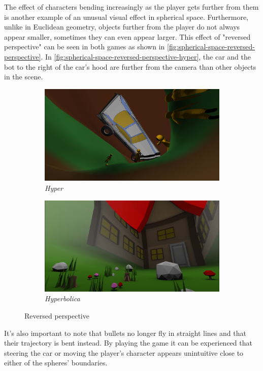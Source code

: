 The effect of characters bending increasingly as the player gets further from them is another example of an unusual visual effect in spherical space.
Furthermore, unlike in Euclidean geometry, objects further from the player do not always appear smaller, sometimes they can even appear larger.
This effect of "reversed perspective" can be seen in both games as shown in \autoref{fig:spherical-space-reversed-perspective}.
In \autoref{fig:spherical-space-reversed-perspective-hyper}, the car and the bot to the right of the car's hood are further from the camera than other objects in the scene.
\begin{figure}[h]
    \centering
    \begin{subfigure}[b]{0.475\textwidth}
        \centering
        \includegraphics[width=\textwidth]{chapters/results/sections/non_euclidean/resources/spherical-car.png}
        \caption[]%
        {{\small \textit{Hyper}}}
        \label{fig:spherical-space-reversed-perspective-hyper}
    \end{subfigure}
    \hfill
    \begin{subfigure}[b]{0.5\textwidth}
        \centering
        \includegraphics[width=\textwidth]{chapters/results/sections/non_euclidean/resources/hyperbolica-2.png}
        \caption[]%
        {{\small \textit{Hyperbolica}}}
        \label{fig:spherical-space-reversed-perspective-hyperbolica}
    \end{subfigure}
    \caption[]
    {\small Reversed perspective}
    \label{fig:spherical-space-reversed-perspective}
\end{figure}
It's also important to note that bullets no longer fly in straight lines and that their trajectory is bent instead.
By playing the game it can be experienced that steering the car or moving the player's character appears unintuitive close to either of the spheres' boundaries.